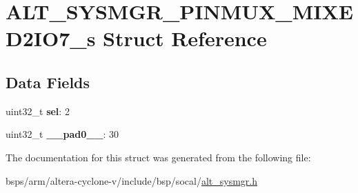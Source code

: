 \hypertarget{structALT__SYSMGR__PINMUX__MIXED2IO7__s}{}\section{A\+L\+T\+\_\+\+S\+Y\+S\+M\+G\+R\+\_\+\+P\+I\+N\+M\+U\+X\+\_\+\+M\+I\+X\+E\+D2\+I\+O7\+\_\+s Struct Reference}
\label{structALT__SYSMGR__PINMUX__MIXED2IO7__s}
\subsection*{Data Fields}
\begin{DoxyCompactItemize}
\item 
\mbox{\label{structALT__SYSMGR__PINMUX__MIXED2IO7__s_a038d822f3ed0e1d70d351dff2e0a6078}} 
uint32\+\_\+t {\bfseries sel}\+: 2
\item 
\mbox{\label{structALT__SYSMGR__PINMUX__MIXED2IO7__s_a8f396fc03fd9b488b737d84ae1114482}} 
uint32\+\_\+t {\bfseries \+\_\+\+\_\+pad0\+\_\+\+\_\+}\+: 30
\end{DoxyCompactItemize}


The documentation for this struct was generated from the following file\+:\begin{DoxyCompactItemize}
\item 
bsps/arm/altera-\/cyclone-\/v/include/bsp/socal/\mbox{\hyperlink{alt__sysmgr_8h}{alt\+\_\+sysmgr.\+h}}\end{DoxyCompactItemize}
